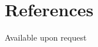 \section*{References}
\vspace{\itemsep}


\begin{changemargin}{\lindent}{\rindent} 
    Available upon request
\end{changemargin}

\vspace{1.5\itemsep}
